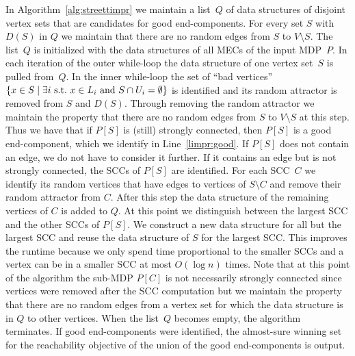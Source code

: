 \documentclass[11pt,letterpaper]{article}
\newcommand{\set}[1]{\{#1\}}
\newcommand{\mdp}{P\xspace}
\newcommand{\ec}{X\xspace}
\newcommand{\inec}{\expandafter\MakeLowercase\expandafter{\ec}\xspace}
\newcommand{\scc}{C\xspace}
\newcommand{\ds}{\mathit{D}\xspace}
\begin{document}
In Algorithm~\ref{alg:streettimpr} we maintain a list~$Q$ of data structures
of disjoint vertex sets that are candidates for good end-components. 
For every set $S$ with $\ds(S)$ in $Q$ we maintain that there are no random edges 
from $S$ to $V\setminus S$. The list~$Q$
is initialized with the data structures of all MECs of the input MDP~$\mdp$. 
In each iteration
of the outer while-loop the data structure of one vertex set~$S$ is pulled 
from~$Q$. In the inner while-loop the set of ``bad vertices'' 
$\set{\inec \in S \mid \exists i \text{ s.t.\ } \inec \in L_i 
\text{ and } S \cap U_i = \emptyset}$ is identified and its random attractor
is removed from $S$ and $\ds(S)$. Through removing the random attractor we 
maintain the property that there are no random edges from $S$ to $V \setminus S$
at this step. Thus we have that if $\mdp[S]$ is (still) strongly connected, then $\mdp[S]$ is a good end-component, which 
we identify in Line~\ref{limpr:good}.
If $\mdp[S]$ does not contain an edge, we do not have to consider it further.
If it contains an edge but is not strongly connected, the SCCs of $\mdp[S]$
are identified. For each SCC~$\scc$ we identify its random vertices that have edges 
to vertices of $S \setminus \scc$ and remove their random attractor from $\scc$.
After this step the data structure of the remaining vertices of $\scc$ is added to $Q$.
At this point we distinguish between the largest SCC and the other SCCs of $\mdp[S]$.
We construct a new data structure for all but the largest SCC and reuse the 
data structure of $S$ for the largest SCC. This improves the runtime because
we only spend time proportional to the smaller SCCs and a vertex can be in a 
smaller SCC at most $O(\log n)$ times. Note that at this point of the algorithm
the sub-MDP $\mdp[C]$ is not necessarily strongly connected since vertices were
removed after the SCC computation
but we maintain the property that there are no random edges from a vertex
set for which the data structure is in $Q$ to other vertices.
When the list~$Q$ becomes empty, the algorithm terminates. If good end-components
were identified, the almost-sure winning set for the reachability objective
of the union of the good end-components is output.
\end{document}
